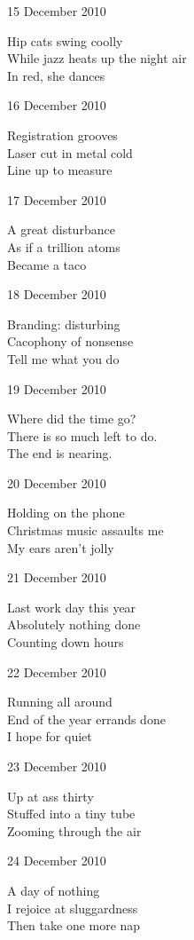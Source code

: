 \documentclass[12pt]{article}
\begin{document}
15 December 2010

Hip cats swing coolly \\
While jazz heats up the night air \\
In red, she dances

16 December 2010

Registration grooves \\
Laser cut in metal cold \\
Line up to measure

17 December 2010

A great disturbance \\
As if a trillion atoms \\
Became a taco

\newpage

18 December 2010

Branding: disturbing \\
Cacophony of nonsense  \\
Tell me what you do

19 December 2010

Where did the time go? \\
There is so much left to do. \\
The end is nearing.

20 December 2010

Holding on the phone \\
Christmas music assaults me \\
My ears aren't jolly

21 December 2010

Last work day this year \\
Absolutely nothing done \\
Counting down hours

22 December 2010

Running all around \\
End of the year errands done \\
I hope for quiet

23 December 2010

Up at ass thirty \\
Stuffed into a tiny tube \\
Zooming through the air

24 December 2010

A day of nothing \\
I rejoice at sluggardness \\
Then take one more nap

\newpage
\end{document}
